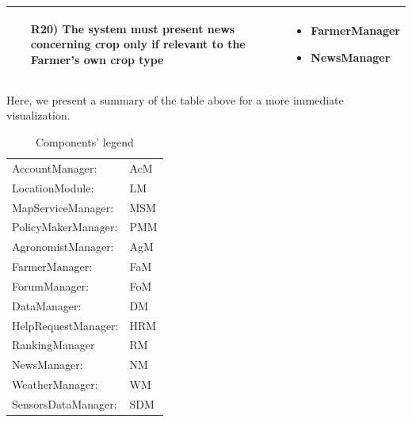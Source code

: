 \documentclass[table, 12pt]{article}
\begin{document}
\begin{longtable}{|p{}|p{}|}
    \begin{itemize}
        \item[R20)] The system must present news concerning crop only if relevant to the Farmer's own crop type 
    \end{itemize}
    &
    \begin{itemize}
        \item FarmerManager
        \item NewsManager
    \end{itemize}
    \\\hline
\end{longtable}

Here, we present a summary of the table above for a more immediate visualization.
\begin{table}[H]
    \centering
    \begin{tabular}{|l l|}
        \hline
        AccountManager:& AcM\\
        LocationModule:& LM\\
        MapServiceManager:& MSM\\
        PolicyMakerManager:& PMM\\
        AgronomistManager:& AgM\\
        FarmerManager:& FaM\\
        ForumManager:& FoM\\
        DataManager:& DM\\
        HelpRequestManager:& HRM\\
        RankingManager & RM\\
        NewsManager:& NM\\
        WeatherManager:& WM\\
        SensorsDataManager:& SDM\\\hline
        
    \end{tabular}
    \caption{Components' legend}
\end{table}
\newpage
\setlength\LTleft{-1.94cm}
\end{document}
